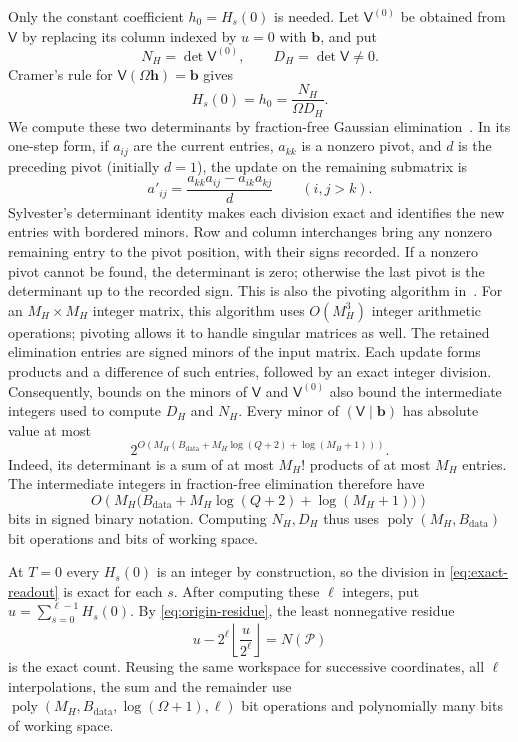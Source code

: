 \documentclass[11pt,reqno]{amsart}
\numberwithin{equation}{section}
\theoremstyle{definition}\newtheorem{definition}[theorem]{Definition}
\theoremstyle{remark}\newtheorem{remark}[theorem]{Remark}
\newcommand{\poly}{\operatorname{poly}}
\begin{document}
Only the constant coefficient $h_0=H_s(0)$ is needed. Let
$\mathsf V^{(0)}$ be obtained from $\mathsf V$ by replacing its
column indexed by $u=0$ with $\mathbf b$, and put
\[
 N_H=\det\mathsf V^{(0)},\qquad D_H=\det\mathsf V\ne0.
\]
Cramer's rule for $\mathsf V(\Omega\mathbf h)=\mathbf b$ gives
\begin{equation}\label{eq:exact-readout}
 H_s(0)=h_0=\frac{N_H}{\Omega D_H}.
\end{equation}
We compute these two determinants by fraction-free Gaussian
elimination~\cite[Sections~I--II and~IV--V]{Bareiss68}. In its
one-step form, if $a_{ij}$ are the current entries, $a_{kk}$ is
a nonzero pivot, and $d$ is the preceding pivot (initially $d=1$),
the update on the remaining submatrix is
\[
 a'_{ij}=\frac{a_{kk}a_{ij}-a_{ik}a_{kj}}{d}
 \qquad(i,j>k).
\]
Sylvester's determinant identity makes each division exact and
identifies the new entries with bordered minors. Row and column
interchanges bring any nonzero remaining entry to the pivot
position, with their signs recorded. If a nonzero pivot cannot be
found, the determinant is zero; otherwise the
last pivot is the determinant up to the recorded sign. This is also
the pivoting algorithm in~\cite[Algorithm~2 and proof of Theorem~6]{MJK21}.
For an
$M_H\times M_H$ integer matrix, this algorithm uses $O(M_H^3)$
integer arithmetic operations; pivoting allows it to handle
singular matrices as well. The retained elimination entries are
signed minors of the input matrix. Each update forms products
and a difference of such entries, followed by an exact integer
division. Consequently, bounds on the minors of $\mathsf V$ and
$\mathsf V^{(0)}$ also bound the intermediate integers used to
compute $D_H$ and $N_H$.
Every minor of $(\mathsf V\mid\mathbf b)$ has absolute value at most
\[
 2^{O\left(M_H\left(B_{\mathrm{data}}+
                M_H\log(Q+2)+\log(M_H+1)\right)\right)}.
\]
Indeed, its determinant is a sum of at most $M_H!$ products of at
most $M_H$ entries. The intermediate integers in fraction-free
elimination therefore have
\[
 O\!\left(M_H\bigl(B_{\mathrm{data}}+
                   M_H\log(Q+2)+\log(M_H+1)\bigr)\right)
\]
bits in signed binary notation. Computing $N_H,D_H$ thus uses
$\poly(M_H,B_{\mathrm{data}})$ bit operations and bits of working space.

At $T=0$ every $H_s(0)$ is an integer by construction, so the
division in \eqref{eq:exact-readout} is exact for each $s$. After
computing these $\ell$ integers, put $u=\sum_{s=0}^{\ell-1}H_s(0)$.
By \eqref{eq:origin-residue}, the least nonnegative residue
\[
 u-2^\ell\left\lfloor\frac{u}{2^\ell}\right\rfloor=N(\mathcal P)
\]
is the exact count. Reusing the same workspace for successive
coordinates, all $\ell$ interpolations, the sum and the remainder
use $\poly(M_H,B_{\mathrm{data}},\log(\Omega+1),\ell)$ bit operations
and polynomially many bits of working space.
\end{document}
